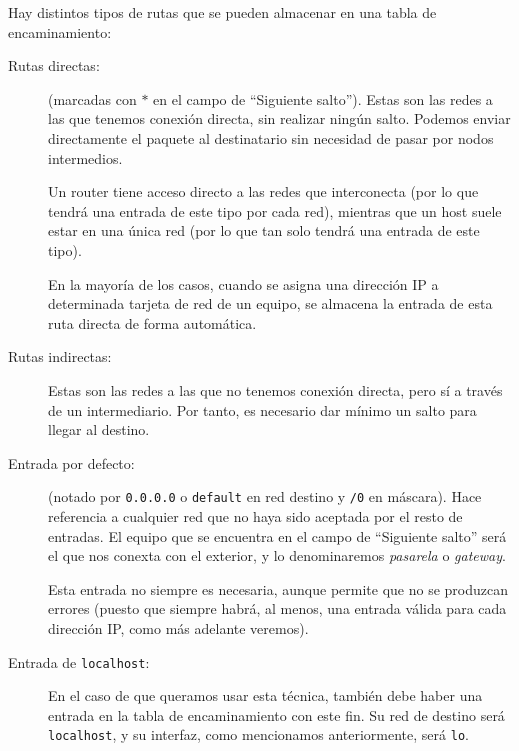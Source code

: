 Hay distintos tipos de rutas que se pueden almacenar en una tabla de encaminamiento:
\begin{description}
    \item [Rutas directas:] (marcadas con $\ast$ en el campo de ``Siguiente salto''). Estas son las redes a las que tenemos conexión directa, sin realizar ningún salto. Podemos enviar directamente el paquete al destinatario sin necesidad de pasar por nodos intermedios.
    
    Un router tiene acceso directo a las redes que interconecta (por lo que tendrá una entrada de este tipo por cada red), mientras que un host suele estar en una única red (por lo que tan solo tendrá una entrada de este tipo).

    En la mayoría de los casos, cuando se asigna una dirección IP a determinada tarjeta de red de un equipo, se almacena la entrada de esta ruta directa de forma automática.
    \item [Rutas indirectas:] Estas son las redes a las que no tenemos conexión directa, pero sí a través de un intermediario. Por tanto, es necesario dar mínimo un salto para llegar al destino.
     
    \item [Entrada por defecto:] (notado por \verb|0.0.0.0| o \verb|default| en red destino y \verb|/0| en máscara). Hace referencia a cualquier red que no haya sido aceptada por el resto de entradas. El equipo que se encuentra en el campo de ``Siguiente salto'' será el que nos conexta con el exterior, y lo denominaremos \emph{pasarela} o \textit{gateway}.
    
    Esta entrada no siempre es necesaria, aunque permite que no se produzcan errores (puesto que siempre habrá, al menos, una entrada válida para cada dirección IP, como más adelante veremos).
    
    \begin{comment}
    Además, poner simplemente un \verb|\0| en máscara es equivalente a una entrada por defecto (algo que veremos cuando entendamos el uso de estas tablas).
    \end{comment}

    \item [Entrada de \texttt{localhost}:] En el caso de que queramos usar esta técnica, también debe haber una entrada en la tabla de encaminamiento con este fin. Su red de destino será \verb|localhost|, y su interfaz, como mencionamos anteriormente, será \verb|lo|.
\end{description}

